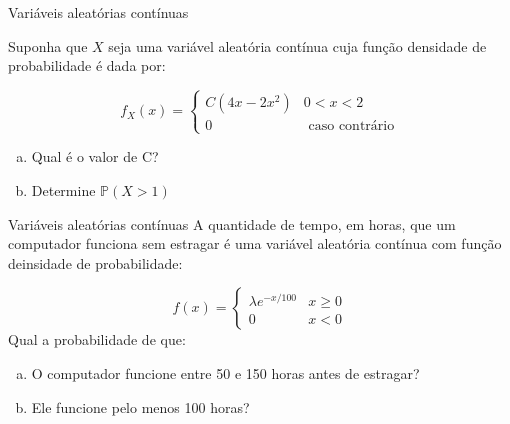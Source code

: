 \begin{frame}{Variáveis aleatórias contínuas}
    \begin{exemplo}[21]
        Suponha que $X$ seja uma variável aleatória contínua cuja função densidade de probabilidade é dada por:

        $$f_X(x) = \begin{cases}
            C(4x -2x^2) & 0<x<2\\
            0 & \text{ caso contrário}
        \end{cases}$$
        \begin{enumerate}[a)]
            \item Qual é o valor de C?
            \item Determine $\mathds{P}(X>1)$
        \end{enumerate}
    \end{exemplo}
\end{frame}

\begin{frame}{Variáveis aleatórias contínuas}
    A quantidade de tempo, em horas, que um computador funciona sem estragar é uma variável aleatória contínua com função deinsidade de probabilidade:

    $$f(x) = \begin{cases}
        \lambda e^{-x/100} & x\geq 0\\
        0& x<0
    \end{cases}$$
    Qual a probabilidade de que:
    \begin{enumerate}[a)]
        \item O computador funcione entre 50 e 150 horas antes de estragar?
        \item Ele funcione pelo menos 100 horas?
    \end{enumerate}
\end{frame}

